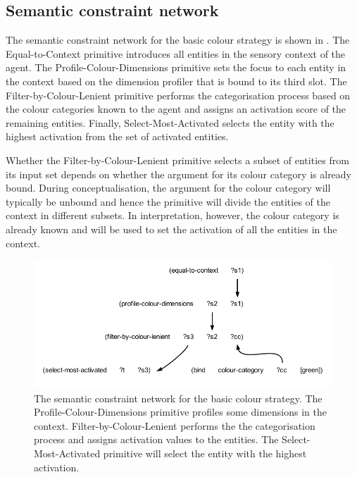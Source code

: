 \subsection{Semantic constraint network}

The semantic constraint network for the basic colour strategy is shown
in . The {\sc
  Equal-to-Context} primitive introduces all entities in the sensory
context of the agent. The {\sc Profile-Colour-Dimensions} primitive
sets the focus to each entity in the context based on the dimension
profiler that is bound to its third slot. The {\sc
  Filter-by-Colour-Lenient} primitive performs the categorisation
process based on the colour categories known to the agent and assigns
an activation score of the remaining entities. Finally, {\sc
  Select-Most-Activated} selects the entity with the highest
activation from the set of activated entities.

Whether the {\sc Filter-by-Colour-Lenient} primitive selects a subset
of entities from its input set depends on whether the argument for its
colour category is already bound. During conceptualisation, the
argument for the colour category will typically be unbound and hence
the primitive will divide the entities of the context in different
subsets. In interpretation, however, the colour category is already
known and will be used to set the activation of all the entities in
the context.

\begin{figure}
  \begin{center}
    \includegraphics[width=.8\textwidth]{./basic-strategy/figures/semantics-interpretation.pdf}
    \caption[The semantic constraint network for the basic colour
    strategy]{The semantic constraint network for the basic colour
      strategy. The {\sc Profile-Colour-Dimensions} primitive profiles
      some dimensions in the context. {\sc Filter-by-Colour-Lenient}
      performs the the categorisation process and assigns activation
      values to the entities. The {\sc Select-Most-Activated}
      primitive will select the entity with the highest activation.}
    \label{f:bcs-semantic-structure}
  \end{center}
\end{figure}

